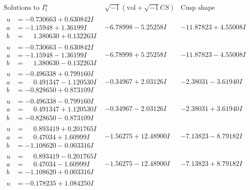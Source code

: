 \documentclass[1p]{elsarticle_modified}
\theoremstyle{definition}
\newcommand{\I}{\sqrt{-1}}
\begin{document}
$$\begin{array}{c|c|c}  
\text{Solutions to }I^u_{1}& \I (\text{vol} + \sqrt{-1}CS) & \text{Cusp shape}\\
 \hline 
\begin{aligned}
u &= -0.730663 + 0.630842 I \\
a &= -1.15948 + 1.36199 I \\
b &= \phantom{-}1.380630 + 0.132263 I\end{aligned}
 & -6.78998 - 5.25258 I & -11.87823 + 4.55008 I \\ \hline\begin{aligned}
u &= -0.730663 - 0.630842 I \\
a &= -1.15948 - 1.36199 I \\
b &= \phantom{-}1.380630 - 0.132263 I\end{aligned}
 & -6.78998 + 5.25258 I & -11.87823 - 4.55008 I \\ \hline\begin{aligned}
u &= -0.496338 + 0.799160 I \\
a &= \phantom{-}0.491347 - 1.120530 I \\
b &= -0.828650 + 0.873109 I\end{aligned}
 & -0.34967 + 2.03126 I & -2.38031 - 3.61940 I \\ \hline\begin{aligned}
u &= -0.496338 - 0.799160 I \\
a &= \phantom{-}0.491347 + 1.120530 I \\
b &= -0.828650 - 0.873109 I\end{aligned}
 & -0.34967 - 2.03126 I & -2.38031 + 3.61940 I \\ \hline\begin{aligned}
u &= \phantom{-}0.893419 + 0.201765 I \\
a &= \phantom{-}0.47034 + 1.60999 I \\
b &= -1.108620 - 0.003316 I\end{aligned}
 & -1.56275 + 12.48900 I & -7.13823 - 8.79182 I \\ \hline\begin{aligned}
u &= \phantom{-}0.893419 - 0.201765 I \\
a &= \phantom{-}0.47034 - 1.60999 I \\
b &= -1.108620 + 0.003316 I\end{aligned}
 & -1.56275 - 12.48900 I & -7.13823 + 8.79182 I \\ \hline\begin{aligned}
u &= -0.178235 + 1.084250 I \\

\end{aligned}
\end{array}$$
\end{document}
